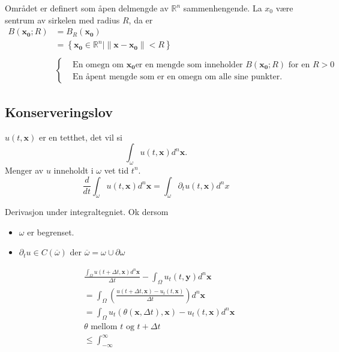 \documentclass{article}
\theoremstyle{remark}
\begin{document}
\begin{definition}
  Området er definert som åpen delmengde av $\mathbb{R} ^{n} $ sammenhengende. La $x_{0}$ være sentrum av sirkelen med radius $R$, da er \[
    \begin{split}
  B\left( \mathbf{x_{0}}; R \right)  & =  B_{R} \left( \mathbf{x_{0}} \right)\\
  &= \left\{ \mathbf{x_{0}} \in  \mathbb{R} ^{n}  \mid  \|\mathbf{x} - \mathbf{x_{0}}\| < R \right\} \\
  \\
    & \begin{cases}
       & \text{En omegn om } \mathbf{x_{0}} \text{er en mengde som inneholder  } B\left( \mathbf{x_{0}}; R \right) \text{ for en }  R > 0\\
       &\text{En åpent mengde som er en omegn }  \text{om alle sine punkter.}
  \end{cases}
    \end{split} 
  \] 
\end{definition}


\subsection{Konserveringslov}%
\label{sub:konserveringslov}

$u\left( t , \mathbf{x}\right)$ er en tetthet, det vil si \[
\int_{\omega }^{} u\left( t, \mathbf{x} \right) d^{n} \mathbf{x} .
\] 
Menger av $u$ inneholdt i $\omega $ vet tid $t^{n}$. \[
\frac{d }{d t} \int_{\omega }^{} u\left( t, \mathbf{x} \right) d ^{n} \mathbf{x} = \int_{\omega }^{} \partial _{t} u\left( t, \mathbf{x} \right) d^{n}x     
\] 

Derivasjon under integraltegniet. Ok dersom
\begin{itemize}
  \item $\omega $ er begrenset.
  \item $\partial _{t} u  \in  C \left( \overline{\omega } \right) $ der $\overline{\omega } = \omega \cup \partial \omega $
\end{itemize}

\[
  \begin{split}
    &  \frac{\int_{\Omega }^{} u\left( t + \Delta  t, \mathbf{x} \right) d^{n} \mathbf{x}}{\Delta t}  - \int_{\Omega }^{} u_{t} \left( t, \mathbf{y} \right) d^{n}    \mathbf{x}  \\
    &=  \int_{\Omega }^{} \left( \frac{u\left( t + \Delta t , \mathbf{x}\right) - u_{t}\left(t, \mathbf{x}  \right) }{\Delta t}   \right) d^{n} \mathbf{x}  \\
     &=   \int_{\Omega }^{} u_{t} \left( \theta \left( \mathbf{x}, \Delta t \right), \mathbf{x} \right) - u_{t}\left( t, \mathbf{x} \right) d^{n} \mathbf{x}  \\
      &  \theta \text{ mellom } t \text{ og } t + \Delta t \\
       &  \le \int_{-\infty}^{\infty}  
  \end{split} 
\] 
\end{document}

